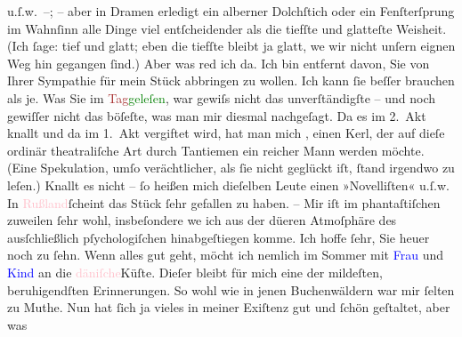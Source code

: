                u.ſ.w. –; – aber in Dramen erledigt ein alberner Dolchſtich {\pb}oder ein Fenſterſprung im Wahnſinn alle Dinge viel
               entſcheidender als die tiefſte und glatteſte Weisheit. (Ich ſage: tief und glatt;
               eben die tiefſte bleibt ja glatt, we{\geminationn} wir nicht unſern
               eignen Weg hin gegangen ſind.) Aber was red ich da. Ich bin entfernt davon, Sie von
               Ihrer Sympathie für mein Stück abbringen zu wollen. Ich kann ſie beſſer brauchen als
               je. Was Sie im \textcolor{brown}{Tag}{}\ledrightnote{\textcolor{brown}{Der Tag}}{ }\textcolor{green}{geleſen}{}, war {\pb}gewiſs nicht das unverſtändigſte – und noch
               gewiſſer nicht das böſeſte, was man mir diesmal nachgeſagt. Da es im 2. Akt knallt
               und da im 1. Akt vergiftet wird, hat man mich \label{K_L01590_1v}\label{K_L01590_1h}, einen Kerl, der auf dieſe ordinär
               theatraliſche Art durch Tantiemen ein reicher Mann werden möchte. (Eine Spekulation,
               umſo verächtlicher, als ſie nicht geglückt iſt, ſtand irgendwo zu {\pb}leſen.) Knallt es nicht – ſo heißen mich dieſelben
               Leute einen »Novelliſten« u.ſ.w. In \textcolor{pink}{Rußland}{}\ledrightnote{\textcolor{pink}{Russland}}{ }ſcheint das Stück ſehr gefallen zu haben. – Mir iſt
               im phantaſtiſchen zuweilen ſehr wohl, insbeſondere we{\geminationn}
               ich aus der dü{\geminationn}eren Atmoſphäre des ausſchließlich
               pſychologiſchen hinabgeſtiegen komme.\pend
           \pstart
           Ich hoffe ſehr, Sie heuer noch zu ſehn. Wenn alles gut geht, möcht ich nemlich im
               Sommer mit \textcolor{blue}{Frau}{} und \textcolor{blue}{Kind}{} an die \textcolor{pink}{däniſche}{}\ledrightnote{\textcolor{pink}{Dänemark}}{ }{\pb}Küſte. Dieſer \label{K_L01590_2v}\label{K_L01590_2h} bleibt für mich eine der mildeſten,
               beruhigendſten Erinnerungen. So wohl wie in jenen Buchenwäldern war mir ſelten zu
               Muthe. Nun hat ſich ja vieles in meiner Exiſtenz gut und ſchön geſtaltet, aber was
